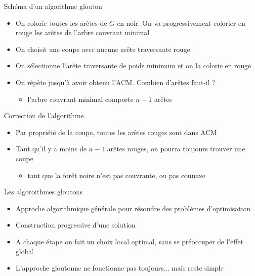 \begin{frame}{Schéma d'un algorithme glouton}
    \begin{itemize}
        \item On colorie toutes les arêtes de $G$ en noir. On va progressivement colorier en rouge les arêtes de l'arbre couvrant minimal 
        \item On choisit une coupe avec aucune arête traversante rouge 
        \item On sélectionne l'arête traversante de poids minimum et on la colorie en rouge 
        \item On répète jusqu'à avoir obtenu l'ACM. Combien d'arêtes faut-il ? 
        \begin{itemize}
            \item l'arbre couvrant minimal comporte $n-1$ arêtes 
        \end{itemize}
    \end{itemize}
\end{frame}

\begin{frame}{Correction de l'algorithme}
    \begin{itemize}
        \item Par propriété de la coupe, toutes les arêtes rouges sont dans ACM 
        \item Tant qu'il y a moins de $n-1$ arêtes rouges, on pourra toujours trouver une coupe 
        \begin{itemize}
            \item tant que la forêt noire n'est pas couvrante, ou pas connexe 
        \end{itemize}
    \end{itemize}
\end{frame}


\begin{frame}{Les algoroithmes gloutons}
    \begin{itemize}
        \item Approche algorithmique générale pour résoudre des problèmes d'optimisation 
        \item Construction progressive d'une solution 
        \item A chaque étape on fait un choix local optimal, sans se préoccuper de l'effet global
        \item L'approche gloutonne ne fonctionne pas toujours... mais reste simple 
    \end{itemize}
\end{frame}



